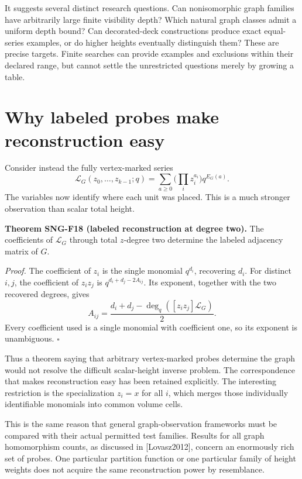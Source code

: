 \documentclass[
  11pt,
  a4paper,
]{report}
\begin{document}
It suggests several distinct research questions. Can nonisomorphic graph
families have arbitrarily large finite visibility depth? Which natural
graph classes admit a uniform depth bound? Can decorated-deck
constructions produce exact equal-series examples, or do higher heights
eventually distinguish them? These are precise targets. Finite searches
can provide examples and exclusions within their declared range, but
cannot settle the unrestricted questions merely by growing a table.

\hypertarget{why-labeled-probes-make-reconstruction-easy}{%
\section{Why labeled probes make reconstruction
easy}\label{why-labeled-probes-make-reconstruction-easy}}

Consider instead the fully vertex-marked series \[
\mathscr L_G(z_0,\ldots,z_{k-1};q)
=\sum_{a\ge0}\bigl(\prod_i z_i^{a_i}\bigr)q^{E_G(a)}.
\] The variables now identify where each unit was placed. This is a much
stronger observation than scalar total height.

\textbf{Theorem SNG-F18 (labeled reconstruction at degree two).} The
coefficients of \(\mathscr L_G\) through total \(z\)-degree two
determine the labeled adjacency matrix of \(G\).

\emph{Proof.} The coefficient of \(z_i\) is the single monomial
\(q^{d_i}\), recovering \(d_i\). For distinct \(i,j\), the coefficient
of \(z_i z_j\) is \(q^{d_i+d_j-2A_{ij}}\). Its exponent, together with
the two recovered degrees, gives \[
A_{ij}=\frac{d_i+d_j-\deg_q([z_i z_j]\mathscr L_G)}2.
\] Every coefficient used is a single monomial with coefficient one, so
its exponent is unambiguous. \(\square\)

Thus a theorem saying that arbitrary vertex-marked probes determine the
graph would not resolve the difficult scalar-height inverse problem. The
correspondence that makes reconstruction easy has been retained
explicitly. The interesting restriction is the specialization \(z_i=x\)
for all \(i\), which merges those individually identifiable monomials
into common volume cells.

This is the same reason that general graph-observation frameworks must
be compared with their actual permitted test families. Results for all
graph homomorphism counts, as discussed in {[}Lovasz2012{]}, concern an
enormously rich set of probes. One particular partition function or one
particular family of height weights does not acquire the same
reconstruction power by resemblance.
\end{document}
